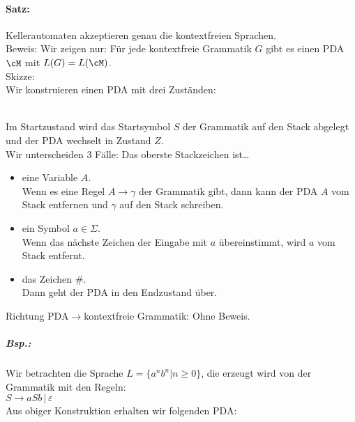 \paragraph{Satz:} Kellerautomaten akzeptieren genau die kontextfreien Sprachen.\\
Beweis: Wir zeigen nur: Für jede kontextfreie Grammatik $G$ gibt es einen PDA $\cM$ mit $L(G)=L(\cM)$.\\
Skizze: \\
Wir konstruieren einen PDA mit drei Zuständen:\\
\\
Im Startzustand wird das Startsymbol $S$ der Grammatik auf den Stack abgelegt und der PDA wechselt in Zustand $Z$.\\
Wir unterscheiden 3 Fälle: Das oberste Stackzeichen ist…
\begin{itemize}
\item eine Variable $A$.\\
Wenn es eine Regel $A\to \gamma$ der Grammatik gibt, dann kann der PDA $A$ vom Stack entfernen und $\gamma$ auf den Stack schreiben.
\item ein Symbol $a\in \Sigma$.\\
Wenn das nächste Zeichen der Eingabe mit $a$ übereinstimmt, wird $a$ vom Stack entfernt.
\item das Zeichen $\#$.\\
Dann geht der PDA in den Endzustand über.
\end{itemize}
Richtung PDA$\to$kontextfreie Grammatik: Ohne Beweis.
\subparagraph{Bsp.:} Wir betrachten die Sprache $L=\{a^nb^n|n\geq 0\}$, die erzeugt wird von der Grammatik mit den Regeln:\\
$S\to aSb \,|\, \varepsilon$\\
Aus obiger Konstruktion erhalten wir folgenden PDA:\\
\\
